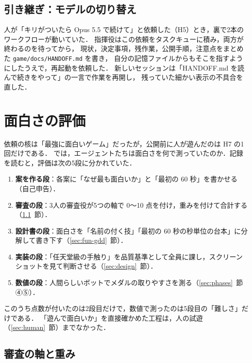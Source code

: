 \documentclass[a4paper,10pt]{ltjsarticle}
\newcommand{\secref}[1]{\ref{#1}~節}
\newcommand{\code}[1]{\texttt{#1}}
\begin{document}
\subsection{引き継ぎ：モデルの切り替え}

人が「キリがついたら Opus 5.5 で続けて」と依頼した（H5）とき，裏で2本のワークフローが動いていた．
指揮役はこの依頼をタスクキューに積み，両方が終わるのを待ってから，
現状，決定事項，残作業，公開手順，注意点をまとめた \code{game/docs/HANDOFF.md} を書き，
自分の記憶ファイルからもそこを指すようにしたうえで，再起動を依頼した．
新しいセッションは「HANDOFF.md を読んで続きをやって」の一言で作業を再開し，
残っていた細かい表示の不具合を直した．

\section{面白さの評価}
\label{sec:fun}

依頼の核は「最強に面白いゲーム」だったが，公開前に人が遊んだのは H7 の1回だけである．
では，エージェントたちは面白さを何で測っていたのか．記録を読むと，評価は次の5段に分かれていた．
\begin{enumerate}
  \item \textbf{案を作る段}：各案に「なぜ最も面白いか」と「最初の 60 秒」を書かせる（自己申告）．
  \item \textbf{審査の段}：3人の審査役が5つの軸で 0〜10 点を付け，重みを付けて合計する（\secref{sec:fun-judge}）．
  \item \textbf{設計書の段}：面白さを「名前の付く技」「最初の 60 秒の秒単位の台本」に分解して書き下す（\secref{sec:fun-gdd}）．
  \item \textbf{実装の段}：「任天堂級の手触り」を品質基準として全員に課し，スクリーンショットを見て判断させる（\secref{sec:design}）．
  \item \textbf{数値の段}：人間らしいボットでメダルの取りやすさを測る（\secref{sec:phases} ④⑤）．
\end{enumerate}
このうち点数が付いたのは2段目だけで，数値で測ったのは5段目の「難しさ」だけである．
「遊んで面白いか」を直接確かめた工程は，人の試遊（\secref{sec:human}）までなかった．

\subsection{審査の軸と重み}
\label{sec:fun-judge}
\end{document}
